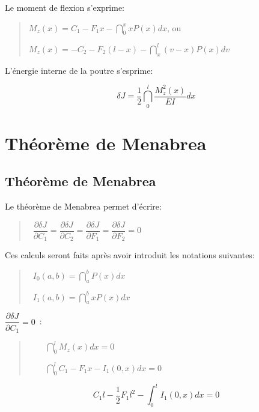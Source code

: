 \medskip
Le moment de flexion s'exprime:

\begin{quotation}
$M_z(x)=C_1-F_1x-\dint_0^x x P(x)dx$, ou

$M_z(x)=-C_2-F_2(l-x)-\dint_x^l(v-x) P(x)dv$
\end{quotation}

\medskip
L'énergie interne de la poutre s'esprime:

\[
\delta J=\frac 12\dint_0^l\dfrac{M_z^2(x)}{EI}dx
\]

\medskip
\ifVersionAvecExemplesSepares
  \section{Théorème de Menabrea}
\else
  \subsection{Théorème de Menabrea}
\fi

Le théorème de Menabrea permet d'écrire:

\begin{quotation}
 ~$\dfrac{\partial \delta J}{\partial C_1} =
  \dfrac{\partial \delta J}{\partial C_2} =
  \dfrac{\partial \delta J}{\partial F_1} =
  \dfrac{\partial \delta J}{\partial F_2} = 0$
\end{quotation}

Ces calculs seront faits après avoir introduit les notations suivantes:
\begin{quotation}
 ~$I_0(a,b)=\dint_a^b P(x)dx$

 ~$I_1(a,b)=\dint_a^b x P(x)dx$
\end{quotation}


$\dfrac{\partial \delta J}{\partial C_1}=0$~:

\begin{quotation}
$\qquad \dint_0^lM_z(x)dx=0$

$\qquad \dint_0^lC_1-F_1x-I_1(0,x)dx=0$
\end{quotation}

\begin{equation}
  \label{MenaC}
  C_1l-\frac 12F_1l^2-\int_0^lI_1(0,x)dx=0
\end{equation}

